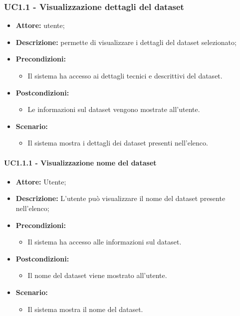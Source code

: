 \subsubsection{UC1.1 - Visualizzazione dettagli del dataset}
\begin{itemize}
    \item \textbf{Attore:} utente;
    \item \textbf{Descrizione:} permette di visualizzare i dettagli del dataset selezionato;
    \item \textbf{Precondizioni:}
    \begin{itemize}
        \item Il sistema ha accesso ai dettagli tecnici e descrittivi del dataset.
    \end{itemize}
    \item \textbf{Postcondizioni:}
    \begin{itemize}
        \item Le informazioni sul dataset vengono mostrate all'utente.
    \end{itemize}
    \item \textbf{Scenario:}
    \begin{itemize}
        \item Il sistema mostra i dettagli dei dataset presenti nell'elenco.
    \end{itemize}
\end{itemize}
\paragraph{UC1.1.1 - Visualizzazione nome del dataset}
\begin{itemize}
    \item \textbf{Attore:} Utente;
    \item \textbf{Descrizione:} L'utente può visualizzare il nome del dataset presente nell'elenco;
    \item \textbf{Precondizioni:}
    \begin{itemize}
        \item Il sistema ha accesso alle informazioni sul dataset.
    \end{itemize}
    \item \textbf{Postcondizioni:}
    \begin{itemize}
        \item Il nome del dataset viene mostrato all'utente.
    \end{itemize}
    \item \textbf{Scenario:}
    \begin{itemize}
        \item Il sistema mostra il nome del dataset.
    \end{itemize}
\end{itemize}
